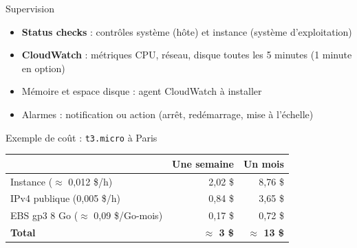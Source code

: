\begin{frame}{Supervision}
  \begin{itemize}
    \setlength{\itemsep}{.5em}
    \item \textbf{Status checks} : contrôles système (hôte) et instance (système d'exploitation)
    \item \textbf{CloudWatch} : métriques CPU, réseau, disque toutes les 5 minutes (1 minute en option)
    \item Mémoire et espace disque : agent CloudWatch à installer
    \item Alarmes : notification ou action (arrêt, redémarrage, mise à l'échelle)
  \end{itemize}
\end{frame}

\begin{frame}{Exemple de coût : \texttt{t3.micro} à Paris}
  \begin{center}
  \renewcommand{\arraystretch}{1.3}
  \begin{tabular}{@{}lrr@{}}
    \toprule
    & \textbf{Une semaine} & \textbf{Un mois} \\ \midrule
    Instance (\(\approx\) 0,012 \$/h) & 2,02 \$ & 8,76 \$ \\
    IPv4 publique (0,005 \$/h) & 0,84 \$ & 3,65 \$ \\
    EBS gp3 8 Go (\(\approx\) 0,09 \$/Go-mois) & 0,17 \$ & 0,72 \$ \\ \midrule
    \textbf{Total} & \textbf{\(\approx\) 3 \$} & \textbf{\(\approx\) 13 \$} \\ \bottomrule
  \end{tabular}
  \end{center}
\end{frame}


